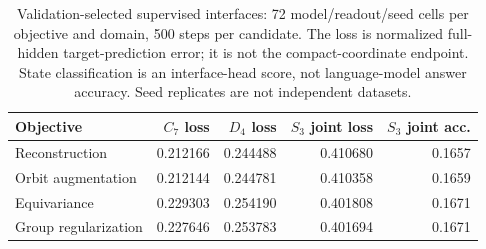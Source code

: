 \begin{table}[htbp]
\caption{Validation-selected supervised interfaces: 72 model/readout/seed cells per objective and domain, 500 steps per candidate. The loss is normalized full-hidden target-prediction error; it is not the compact-coordinate endpoint. State classification is an interface-head score, not language-model answer accuracy. Seed replicates are not independent datasets.}
\label{tab:reproduction-interface}\centering\small
\begin{tabular}{lrrrr}\toprule
Objective & $C_7$ loss & $D_4$ loss & $S_3$ joint loss & $S_3$ joint acc. \\
\midrule
Reconstruction & 0.212166 & 0.244488 & 0.410680 & 0.1657 \\
Orbit augmentation & 0.212144 & 0.244781 & 0.410358 & 0.1659 \\
Equivariance & 0.229303 & 0.254190 & 0.401808 & 0.1671 \\
Group regularization & 0.227646 & 0.253783 & 0.401694 & 0.1671 \\
\bottomrule\end{tabular}
\end{table}
